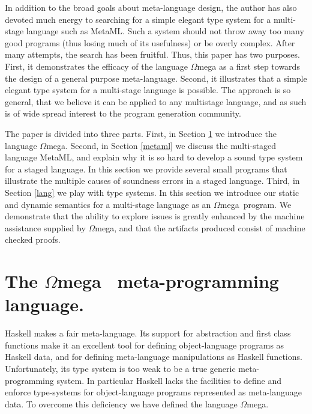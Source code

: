 \documentclass{sigplanconf}
\newcommand{\om}{$\Omega$mega}
\begin{document}
In addition to the broad goals about meta-language design, the author 
has also devoted much energy to searching for a simple elegant type system
for a multi-stage language such as MetaML. Such a
system should not throw away too many good
programs\cite{Moggi-Taha-Benaissa-Sheard-ESOP99,TS00,Taha99} (thus losing
much of its usefulness) or be overly
complex\cite{Calgano-Moggi-Sheard-JFP03,T00,TahNie03}. 
After many attempts, the search has been fruitful. Thus, this paper
has two purposes. First, it demonstrates the efficacy of the language
\om{} as a first step towards the design of a general purpose meta-language.
Second, it illustrates that a simple elegant type system for a multi-stage
language is possible. The approach is so general, that we believe it can
be applied to any multistage language, and as such is of wide spread
interest to the program generation community.

The paper is divided into three parts. First, in Section \ref{omega} we
introduce the language \om. Second, in Section \ref{metaml} we discuss the
multi-staged language MetaML, and explain why it is so hard to develop a sound
type system for a staged language. In this section we provide several small
programs that illustrate the multiple causes of soundness errors in a staged
language. Third, in Section \ref{lang} we play with type systems. In this
section we introduce our static and dynamic semantics for a multi-stage language as
an \om\ program. We demonstrate that the ability to explore issues is greatly
enhanced by the machine assistance supplied by \om, and that the artifacts
produced consist of machine checked proofs.

\section{The \om~ meta-programming language.} \label{omega}


Haskell makes a fair meta-language. Its support for abstraction and first
class functions make it an excellent tool for defining object-language
programs as Haskell data, and for defining meta-language manipulations as
Haskell functions. Unfortunately, its type system is too weak to be a true
generic meta-programming system. In particular Haskell lacks the facilities to
define and enforce type-systems for object-language programs represented as
meta-language data. To overcome this deficiency we have defined the language
\om.
\end{document}
